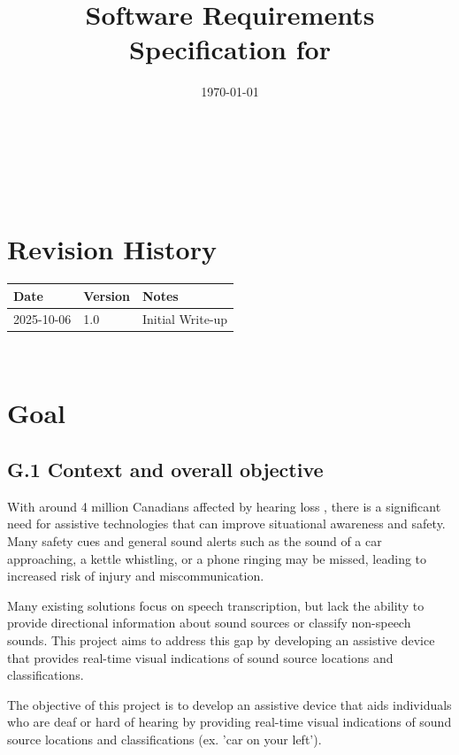 \documentclass[12pt]{article}
\theoremstyle{definition}
\begin{document}
\title{Software Requirements Specification for \progname} 
\author{\authname}
\date{\today}
	
\maketitle

~\newpage


\tableofcontents

~\newpage

\section*{Revision History}


\begin{tabularx}{\textwidth}{p{3cm}p{2cm}X}
\toprule {\bf Date} & {\bf Version} & {\bf Notes}\\
\midrule
2025-10-06 & 1.0 & Initial Write-up\\
\bottomrule
\end{tabularx}


~\newpage


\section{Goal}

\subsection{G.1 Context and overall objective}

With around 4 million Canadians affected by hearing loss \cite{Healthing2025}, 
there is a significant need for assistive technologies that can improve 
situational awareness and safety.
Many safety cues and general sound alerts such as the sound of a car 
approaching, a kettle whistling,
or a phone ringing may be missed, leading to increased risk of injury and
miscommunication.

Many existing solutions focus on speech transcription, but lack the ability to
provide directional information about sound sources or classify non-speech
sounds. This project aims to address this gap by developing an assistive device
that provides real-time visual indications of sound source locations and 
classifications.

The objective of this project is to develop an assistive device that aids
individuals who are deaf or hard of hearing by providing real-time visual
indications of sound source locations and classifications (ex. 'car on your 
left').
\end{document}
